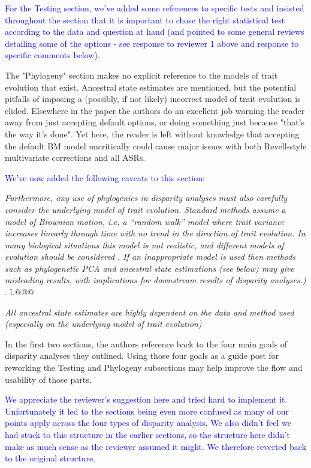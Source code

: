 \documentclass[12pt,letterpaper]{article}
\begin{document}
\textcolor{blue}{For the Testing section, we've added some references to specific tests and insisted throughout the section that it is important to chose the right statistical test according to the data and question at hand (and pointed to some general reviews detailing some of the options - see response to reviewer 1 above and response to specific comments below).}

\noindent The "Phylogeny" section makes no explicit reference to the models of trait evolution that exist. Ancestral state estimates are mentioned, but the potential pitfalls of imposing a (possibly, if not likely) incorrect model of trait evolution is elided. Elsewhere in the paper the authors do an excellent job warning the reader away from just accepting default options, or doing something just because "that's the way it's done". Yet here, the reader is left without knowledge that accepting the default BM model uncritically could cause major issues with both Revell-style multivariate corrections and all ASRs.

\textcolor{blue}{We've now added the following caveats to this section:}

\textit{Furthermore, any use of phylogenies in disparity analyses must also carefully consider the underlying model of trait evolution. Standard methods assume a model of Brownian motion, i.e. a ``random walk'' model where trait variance increases linearly through time with no trend in the direction of trait evolution. In many biological situations this model is not realistic, and different models of evolution should be considered \citealt{blomberg2020}. If an inappropriate model is used then methods such as phylogenetic PCA and ancestral state estimations (see below) may give misleading results, with implications for downstream results of disparity analyses.)} . l.@@@

\textit{All ancestral state estimates are highly dependent on the data and method used (especially on the underlying model of trait evolution)}

\noindent In the first two sections, the authors reference back to the four main goals of disparity analyses they outlined. Using those four goals as a guide post for reworking the Testing and Phylogeny subsections may help improve the flow and usability of those parts.

\textcolor{blue}{We appreciate the reviewer's suggestion here and tried hard to implement it. Unfortunately it led to the sections being even more confused as many of our points apply across the four types of disparity analysis. We also didn't feel we had stuck to this structure in the earlier sections, so the structure here didn't make as much sense as the reviewer assumed it might. We therefore reverted back to the original structure.}
\end{document}
